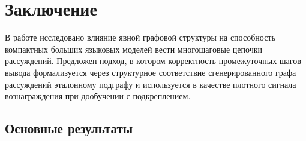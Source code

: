 \section{Заключение}
\label{sec:Chapter5} 

В работе исследовано влияние явной графовой структуры на способность компактных больших языковых моделей вести многошаговые цепочки рассуждений. Предложен подход, в котором корректность промежуточных шагов вывода формализуется через структурное соответствие сгенерированного графа рассуждений эталонному подграфу и используется в качестве плотного сигнала вознаграждения при дообучении с подкреплением.

\subsection{Основные результаты}
\label{subsec:conclusion-results}

